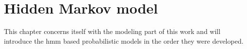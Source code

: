 \documentclass[\relativeRoot/main.tex]{subfiles}
\begin{document}
\chapter{Hidden Markov model}
\label{chap:hmm}

This chapter concerns itself with the modeling part of this work and will introduce the \gls{hmm} based probabilistic models in the order they were developed.




\end{document}
